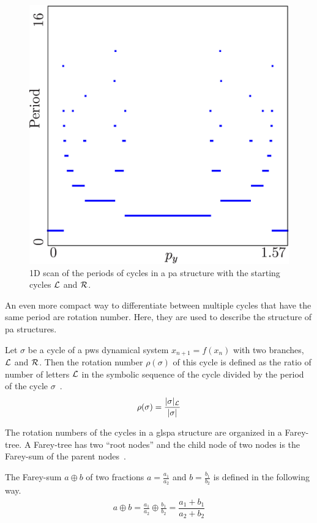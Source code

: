 \begin{figure}
	\centering
	\includegraphics[width=.5 \textwidth]{../Figures/2/2.1/result.png}
	\caption[1D scan of periods in a  structure between $\L$ and $\R$]{
		1D scan of the periods of cycles in a \gls{pa} structure with the starting cycles $\L$ and $\R$.
	}
\end{figure}

An even more compact way to differentiate between multiple cycles that have the same period are rotation number.
Here, they are used to describe the structure of \gls{pa} structures.

\begin{definition}
	\label{def:rotation.numbers}
	Let $\sigma$ be a cycle of a \gls{pws} dynamical system $x_{n+1} = f(x_n)$ with two branches, $\L$ and $\R$.
	Then the rotation number $\rho(\sigma)$ of this cycle is defined as the ratio of number of letters $\L$ in the symbolic sequence of the cycle divided by the period of the cycle $\sigma$~\cite{Keener80}.
	\begin{align}
		\rho(\sigma) = \dfrac{|\sigma|_{\mathcal{L}}}{|\sigma|}
	\end{align}
\end{definition}

The rotation numbers of the cycles in a gls{pa} structure are organized in a Farey-tree.
A Farey-tree has two ``root nodes'' and the child node of two nodes is the Farey-sum of the parent nodes~\cite{granados14adding}.

\begin{definition}
	The Farey-sum $a \oplus b$ of two fractions $a = \frac{a_1}{a_2}$ and $b = \frac{b_1}{b_2}$ is defined in the following way.
	\begin{align}
		a \oplus b = \frac{a_1}{a_2} \oplus \frac{b_1}{b_2} = \dfrac{a_1 + b_1}{a_2 + b_2}
	\end{align}
\end{definition}

